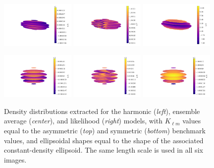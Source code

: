 \documentclass{aastex631}
\begin{document}
\begin{figure}
  \centering
  \includegraphics[width=0.32\textwidth]{harmonic-asym-ell.pdf}
  \includegraphics[width=0.32\textwidth]{ensemble-asym-ell.pdf}
  \includegraphics[width=0.32\textwidth]{likelihood-asym-ell.pdf}

  \includegraphics[width=0.32\textwidth]{harmonic-sym-ell.pdf}
  \includegraphics[width=0.32\textwidth]{ensemble-sym-ell.pdf}
  \includegraphics[width=0.32\textwidth]{likelihood-sym-ell.pdf}
  \caption{Density distributions extracted for the harmonic (\textit{left}), ensemble average (\textit{center}), and likelihood (\textit{right}) models, with $K_{\ell m}$ values equal to the asymmetric (\textit{top}) and symmetric (\textit{bottom}) benchmark values, and ellipsoidal shapes equal to the shape of the associated constant-density ellipsoid. The same length scale is used in all six images.}
  \label{fig:fix-ellipsoid-model-test}
\end{figure}
\end{document}
